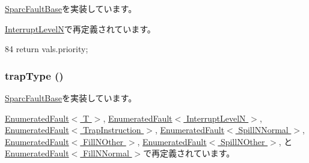 \hyperlink{classSparcISA_1_1SparcFaultBase_a18440b8fb3a4faf5a2dc397c3c2d19c4}{SparcFaultBase}を実装しています。

\hyperlink{classSparcISA_1_1InterruptLevelN_a57b9ac2b92afbf2567e6d7b131900712}{InterruptLevelN}で再定義されています。


\begin{DoxyCode}
84 { return vals.priority; }
\end{DoxyCode}
\hypertarget{classSparcISA_1_1SparcFault_aa059963bc65ed73d2d744374cd6da5b1}{
\subsubsection[{trapType}]{ trapType ()}}
\label{classSparcISA_1_1SparcFault_aa059963bc65ed73d2d744374cd6da5b1}


\hyperlink{classSparcISA_1_1SparcFaultBase_a0950271648d599cac74123f9626ef7d2}{SparcFaultBase}を実装しています。

\hyperlink{classSparcISA_1_1EnumeratedFault_aa059963bc65ed73d2d744374cd6da5b1}{EnumeratedFault$<$ T $>$}, \hyperlink{classSparcISA_1_1EnumeratedFault_aa059963bc65ed73d2d744374cd6da5b1}{EnumeratedFault$<$ InterruptLevelN $>$}, \hyperlink{classSparcISA_1_1EnumeratedFault_aa059963bc65ed73d2d744374cd6da5b1}{EnumeratedFault$<$ TrapInstruction $>$}, \hyperlink{classSparcISA_1_1EnumeratedFault_aa059963bc65ed73d2d744374cd6da5b1}{EnumeratedFault$<$ SpillNNormal $>$}, \hyperlink{classSparcISA_1_1EnumeratedFault_aa059963bc65ed73d2d744374cd6da5b1}{EnumeratedFault$<$ FillNOther $>$}, \hyperlink{classSparcISA_1_1EnumeratedFault_aa059963bc65ed73d2d744374cd6da5b1}{EnumeratedFault$<$ SpillNOther $>$}, と \hyperlink{classSparcISA_1_1EnumeratedFault_aa059963bc65ed73d2d744374cd6da5b1}{EnumeratedFault$<$ FillNNormal $>$}で再定義されています。


